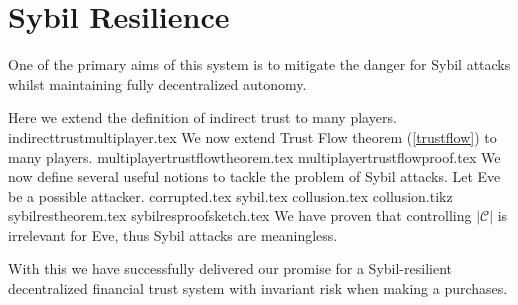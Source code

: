 \section{Sybil Resilience}
  One of the primary aims of this system is to mitigate the danger for Sybil attacks \cite{sybilattack} whilst maintaining
  fully decentralized autonomy.

  Here we extend the definition of indirect trust to many players.
  {indirecttrustmultiplayer.tex}
  We now extend Trust Flow theorem (\ref{trustflow}) to many players.
  {multiplayertrustflowtheorem.tex}
  {multiplayertrustflowproof.tex}
  We now define several useful notions to tackle the problem of Sybil attacks. Let Eve be a possible attacker.
  {corrupted.tex}
  {sybil.tex}
  {collusion.tex}
  {collusion.tikz}
  {sybilrestheorem.tex}
  {sybilresproofsketch.tex}
  We have proven that controlling $|\mathcal{C}|$ is irrelevant for Eve, thus Sybil attacks are meaningless.

  With this we have successfully delivered our promise for a Sybil-resilient decentralized financial trust system with
  invariant risk when making a purchases.

